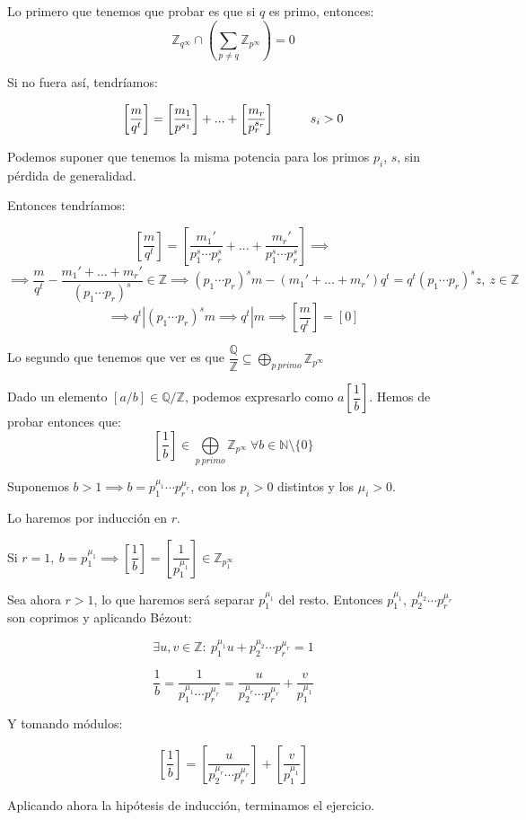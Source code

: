 \documentclass[openany]{book}
\begin{document}
\begin{exercise}
    $ $

    Lo primero que tenemos que probar es que si $ q $ es primo, entonces:
    $$ \mathbb{Z}_{q^{\infty}} \cap \left( \sum\limits_{p\ne q}^{}\mathbb{Z}_{p^{\infty}} \right) = 0 $$

    Si no fuera así, tendríamos:

    $$ \left[\dfrac{m}{q^{t}}\right] = \left[\dfrac{m_1}{p^{s_1}}\right] +...+ \left[\dfrac{m_{r}}{p_{r}^{s_{r}}}\right] \hspace{10mm} s_i > 0 $$

    Podemos suponer que tenemos la misma potencia para los primos $ p_i$, $ s$, sin pérdida de generalidad.
    
    Entonces tendríamos:

    $$ \left[\dfrac{m}{q^{t}}\right] = \left[\dfrac{m_1'}{p_1^{s}\cdots p_{r}^{s}}+...+\dfrac{m_{r}'}{p_1^{s}\cdots p_{r}^{s}}\right] \implies  $$
    $$ \implies \dfrac{m}{q^{t}} - \dfrac{m_1'+...+m_{r}'}{(p_1 \cdots p_{r})^{s}} \in \mathbb{Z} \implies (p_1 \cdots p_{r})^{s} m -(m_1' +...+ m_{r}') q^{t} = q^{t} (p_1 \cdots p_{r})^{s}z,\ z \in \mathbb{Z} $$
    $$ \implies q^{t}| (p_1\cdots p_{r})^{s} m \implies q^{t} | m \implies \left[\dfrac{m}{q^{t}}\right] = [0]$$

    Lo segundo que tenemos que ver es que $ \dfrac{\mathbb{Q}}{\mathbb{Z}} \subseteq  \bigoplus \limits_{p\ primo} \mathbb{Z}_{p^{\infty}} $

    Dado un elemento $ [a/b] \in \mathbb{Q}/\mathbb{Z}$, podemos expresarlo como $ a\left[\dfrac{1}{b}\right]$. Hemos de probar entonces que:
    $$ \left[\dfrac{1}{b}\right] \in \bigoplus\limits_{p\ primo}\mathbb{Z}_{p^{\infty}} \ \forall b \in \mathbb{N} \setminus \{0\}$$

    Suponemos $ b > 1 \implies b = p_1^{\mu_1}\cdots p_{r}^{\mu_{r}}$, con los $ p_i>0$ distintos y  los $ \mu_{i} > 0$.

    Lo haremos por inducción en $ r$.

    Si $ r = 1,\ b = p_1^{\mu_1} \implies \left[\dfrac{1}{b}\right] = \left[\dfrac{1}{p_1^{\mu_1}}\right] \in \mathbb{Z}_{p_1^{\infty}}$

    Sea ahora $ r > 1$, lo que haremos será separar $ p_1^{\mu_1}$ del resto. Entonces $ p_1^{\mu_1},\ p_2^{\mu_2}\cdots p_{r}^{\mu_{r}}$ son coprimos y aplicando Bézout:

    $$ \exists u,v \in \mathbb{Z} :\ p_1^{\mu_1}u + p_2^{\mu_2} \cdots p_{r}^{\mu_{r}} = 1 $$

    $$ \dfrac{1}{b} = \dfrac{1}{p_1^{\mu_1}\cdots p_{r}^{\mu_{r}}} = \dfrac{u}{p_2^{\mu_{r}}\cdots p_{r}^{\mu_{r}}} + \dfrac{v}{p_1^{\mu_{1}}} $$

    Y tomando módulos:

    $$ \left[\dfrac{1}{b}\right] = \left[\dfrac{u}{p_2^{\mu_{r}}\cdots p_{r}^{\mu_{r}}} \right]+ \left[\dfrac{v}{p_1^{\mu_{1}}}\right] $$

    Aplicando ahora la hipótesis de inducción, terminamos el ejercicio.

\end{exercise}
\end{document}
